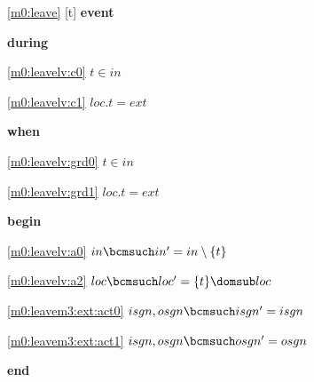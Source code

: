 \noindent \ref{m0:leave} [t] \textbf{event}
\begin{block}
  \item   \textbf{during}
  \begin{block}
  \item[ \eqref{m0:leavelv:c0} ]$t \in in $ %
  \item[ \eqref{m0:leavelv:c1} ]$loc.t = ext $ %
  \end{block}
  \item   \textbf{when}
  \begin{block}
  \item[ \eqref{m0:leavelv:grd0} ]$t \in in $ %
  \item[ \eqref{m0:leavelv:grd1} ]$loc.t = ext $ %
  \end{block}
  \item   \textbf{begin}
  \begin{block}
  \item[ \eqref{m0:leavelv:a0} ]$in \bcmsuch in' = in \setminus \{ t \} $ %
  \item[ \eqref{m0:leavelv:a2} ]$loc \bcmsuch loc' = \{ t \} \domsub loc $ %
  \item[ \eqref{m0:leavem3:ext:act0} ]$isgn,osgn \bcmsuch isgn' = isgn$ %
  \item[ \eqref{m0:leavem3:ext:act1} ]$isgn,osgn \bcmsuch osgn' = osgn$ %
  \end{block}
  \item   \textbf{end} \\
\end{block}
